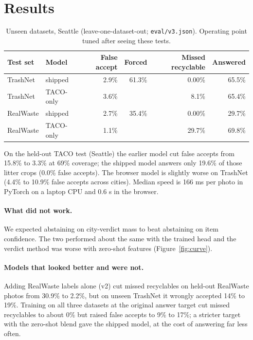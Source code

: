 \documentclass[11pt,a4paper]{article}
\begin{document}
\section{Results}
\begin{table}[ht]
\centering
\caption{Unseen datasets, Seattle (leave-one-dataset-out; \texttt{eval/v3.json}). Operating point tuned after seeing these tests.}
\begin{tabular}{llrrrr}
\toprule
Test set & Model & False accept & Forced & Missed recyclable & Answered\\
\midrule
TrashNet & shipped & 2.9\% & 61.3\% & 0.00\% & 65.5\%\\
TrashNet & TACO-only & 3.6\% & & 8.1\% & 65.4\%\\
RealWaste & shipped & 2.7\% & 35.4\% & 0.00\% & 29.7\%\\
RealWaste & TACO-only & 1.1\% & & 29.7\% & 69.8\%\\
\bottomrule
\end{tabular}
\end{table}

On the held-out TACO test (Seattle) the earlier model cut false accepts from 15.8\% to 3.3\% at 69\% coverage; the shipped model answers only 19.6\% of those litter crops (0.0\% false accepts).
The browser model is slightly worse on TrashNet (4.4\% to 10.9\% false accepts across cities). Median speed is 166 ms per photo in PyTorch on a laptop CPU and 0.6 s in the browser.

\paragraph{What did not work.} We expected abstaining on city-verdict mass to beat abstaining on item confidence. The two
performed about the same with the trained head and the verdict method was worse with zero-shot features (Figure~\ref{fig:curve}).

\paragraph{Models that looked better and were not.} Adding RealWaste labels alone (v2) cut missed recyclables on held-out RealWaste photos from 30.9\% to 2.2\%, but on unseen TrashNet it wrongly accepted 14\% to 19\%. Training on all three datasets at the original answer target cut missed recyclables to about 0\% but raised false accepts to 9\% to 17\%; a stricter target with the zero-shot blend gave the shipped model, at the cost of answering far less often.
\end{document}
